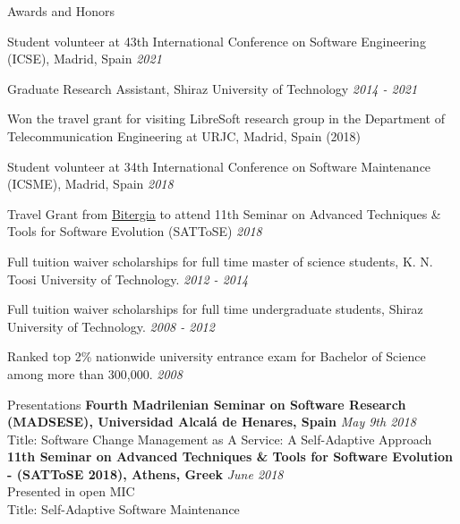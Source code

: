 \documentclass{resume} %
\begin{document}
\begin{rSection}{Awards and Honors}
\item Student volunteer at 43th International Conference on Software Engineering (ICSE), Madrid, Spain  \hfill {\em  2021}
\item Graduate Research Assistant, Shiraz University of Technology \hfill {\em 2014 - 2021}
\item Won the travel grant for visiting LibreSoft research group in the Department of Telecommunication Engineering at URJC, Madrid, Spain (2018)
\item Student volunteer at 34th International Conference on Software Maintenance (ICSME), Madrid, Spain  \hfill {\em  2018}
\item Travel Grant from \href{https://www.bitergia.com} {Bitergia} to attend 11th Seminar on Advanced Techniques \& Tools for Software Evolution (SATToSE) \hfill {\em  2018}
\item Full tuition waiver scholarships for full time master of science students, K. N. Toosi University of Technology. \hfill {\em  2012 - 2014}
\item Full tuition waiver scholarships for full time undergraduate students, Shiraz University of Technology. \hfill {\em  2008 - 2012}
\item Ranked top 2\% nationwide university entrance exam for Bachelor of Science among more than 300,000. \hfill {\em  2008}

\end{rSection}
\begin{rSection}{Presentations}
{\bf Fourth Madrilenian Seminar on Software Research (MADSESE), Universidad Alcalá de Henares, Spain} \hfill {\em May 9th 2018} 
\\ Title: Software Change Management as A Service: A Self-Adaptive Approach\\
{\bf 11th Seminar on Advanced Techniques \& Tools for Software Evolution - (SATToSE 2018), Athens, Greek} \hfill {\em June 2018}
\\ Presented in open MIC 
\\ Title: Self-Adaptive Software Maintenance\\

\end{rSection}
\end{document}
